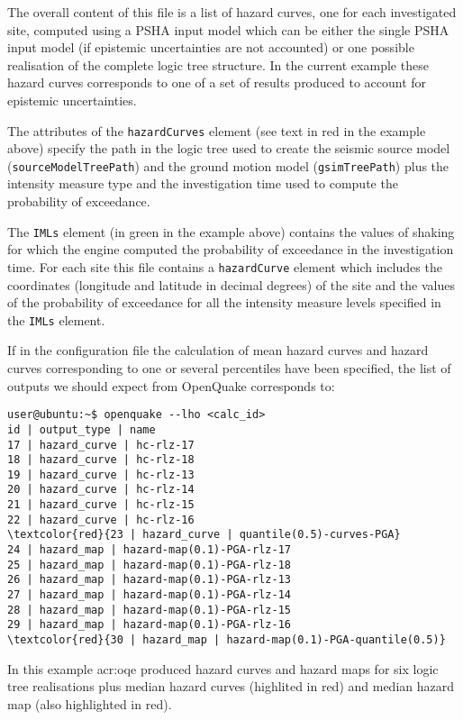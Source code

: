 The overall content of this file is a list of hazard curves, one for
each investigated site, computed using a PSHA input model which 
can be either the single PSHA input model (if epistemic 
uncertainties are not accounted) or one possible realisation of 
the complete logic tree structure. In the current example these 
hazard curves corresponds to one of a set of results produced to 
account for epistemic uncertainties.

The attributes of the \texttt{hazardCurves} element (see text in 
red in the example above) specify the path in the logic tree 
used to create the seismic source model (\texttt{source\-Model\-TreePath}) 
and the ground motion model (\texttt{gsim\-Tree\-Path}) plus the 
intensity measure type and the investigation time used to compute 
the probability of exceedance. 

The \texttt{IMLs} element (in green in the example above) contains the 
values of shaking for which the engine computed the probability of 
exceedance in the investigation time.
For each site this file contains a \texttt{hazardCurve} element which 
includes the coordinates (longitude and latitude in decimal degrees) 
of the site and the values of the probability of exceedance for all the 
intensity measure levels specified in the \texttt{IMLs} element.

If in the configuration file the calculation of mean hazard curves 
and hazard curves corresponding to one or several percentiles have 
been specified, the list of outputs we should expect from OpenQuake 
corresponds to:
\begin{Verbatim}[frame=single, commandchars=\\\{\}, fontsize=\small]
user@ubuntu:~$ openquake --lho <calc_id> 
id | output_type | name
17 | hazard_curve | hc-rlz-17
18 | hazard_curve | hc-rlz-18
19 | hazard_curve | hc-rlz-13
20 | hazard_curve | hc-rlz-14
21 | hazard_curve | hc-rlz-15
22 | hazard_curve | hc-rlz-16
\textcolor{red}{23 | hazard_curve | quantile(0.5)-curves-PGA}
24 | hazard_map | hazard-map(0.1)-PGA-rlz-17
25 | hazard_map | hazard-map(0.1)-PGA-rlz-18
26 | hazard_map | hazard-map(0.1)-PGA-rlz-13
27 | hazard_map | hazard-map(0.1)-PGA-rlz-14
28 | hazard_map | hazard-map(0.1)-PGA-rlz-15
29 | hazard_map | hazard-map(0.1)-PGA-rlz-16
\textcolor{red}{30 | hazard_map | hazard-map(0.1)-PGA-quantile(0.5)}
\end{Verbatim}
In this example \gls{acr:oqe} produced hazard curves and hazard maps for 
six logic tree realisations plus median hazard curves (highlited in red)
and median hazard map (also highlighted in red).

